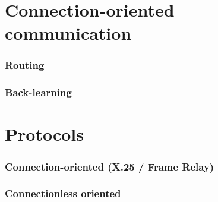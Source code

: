 \documentclass[a4paper,twoside]{article}
\begin{document}
		
\part{Connection-oriented communication}
\section{Routing}
\section{Back-learning}
	
	
\part{Protocols}
\section{Connection-oriented (X.25 / Frame Relay)}
\section{Connectionless oriented}
\end{document}
